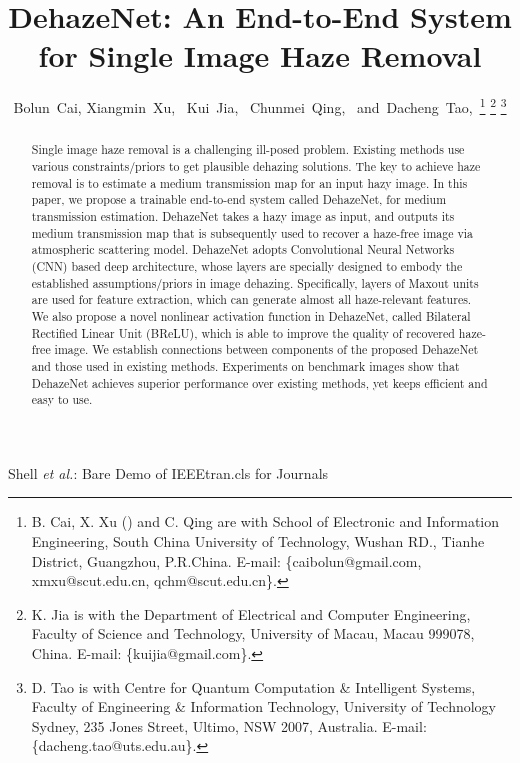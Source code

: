 \documentclass[journal]{IEEEtran}
\begin{document}
\title{DehazeNet: An End-to-End System for Single Image Haze Removal}

\author{Bolun~Cai,
        Xiangmin~Xu,~
        Kui~Jia,~
        Chunmei~Qing,~
        and~Dacheng~Tao,~\thanks{B. Cai, X. Xu (\Letter) and C. Qing are with
 School of Electronic and Information Engineering,
 South China University of Technology,
 Wushan RD., Tianhe District, Guangzhou, P.R.China.
 E-mail: \{caibolun@gmail.com, xmxu@scut.edu.cn, qchm@scut.edu.cn\}.}
 \thanks{K. Jia is with the Department of Electrical and Computer Engineering,
Faculty of Science and Technology, University of Macau, Macau 999078, China.
E-mail: \{kuijia@gmail.com\}.}
\thanks{D. Tao is with Centre for Quantum Computation \& Intelligent Systems,
 Faculty of Engineering \& Information Technology, University of Technology Sydney,
 235 Jones Street, Ultimo, NSW 2007, Australia.
 E-mail: \{dacheng.tao@uts.edu.au\}.}}



\markboth{}
{Shell \MakeLowercase{\textit{et al.}}: Bare Demo of IEEEtran.cls for Journals}
\maketitle

\begin{abstract}
Single image haze removal is a challenging ill-posed problem. Existing methods use various constraints/priors to get plausible dehazing solutions. The key to achieve haze removal is to estimate a medium transmission map for an input hazy image. In this paper, we propose a trainable end-to-end system called DehazeNet, for medium transmission estimation. DehazeNet takes a hazy image as input, and outputs its medium transmission map that is subsequently used to recover a haze-free image via atmospheric scattering model. DehazeNet adopts Convolutional Neural Networks (CNN) based deep architecture, whose layers are specially designed to embody the established assumptions/priors in image dehazing. Specifically, layers of Maxout units are used for feature extraction, which can generate almost all haze-relevant features. We also propose a novel nonlinear activation function in DehazeNet, called Bilateral Rectified Linear Unit (BReLU), which is able to improve the quality of recovered haze-free image.  We establish connections between components of the proposed DehazeNet and those used in existing methods. Experiments on benchmark images show that DehazeNet achieves superior performance over existing methods, yet keeps efficient and easy to use.
\end{abstract}
\end{document}
